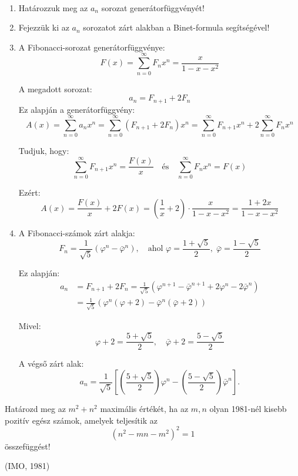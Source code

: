 \begin{solution}
~
\begin{enumerate}
\item Határozzuk meg az $a_{n}$ sorozat generátorfüggvényét! 
\item Fejezzük ki az $a_{n}$ sorozatot zárt alakban a Binet-formula segítségével! 
\item A Fibonacci-sorozat generátorfüggvénye: 
\[
F(x)=\sum_{n=0}^{\infty}F_{n}x^{n}=\frac{x}{1-x-x^{2}}
\]

A megadott sorozat: 
\[
a_{n}=F_{n+1}+2F_{n}
\]
Ez alapján a generátorfüggvény: 
\[
A(x)=\sum_{n=0}^{\infty}a_{n}x^{n}=\sum_{n=0}^{\infty}(F_{n+1}+2F_{n})x^{n}=\sum_{n=0}^{\infty}F_{n+1}x^{n}+2\sum_{n=0}^{\infty}F_{n}x^{n}
\]

Tudjuk, hogy: 
\[
\sum_{n=0}^{\infty}F_{n+1}x^{n}=\frac{F(x)}{x}\quad\text{és}\quad\sum_{n=0}^{\infty}F_{n}x^{n}=F(x)
\]

Ezért: 
\[
A(x)=\frac{F(x)}{x}+2F(x)=\left(\frac{1}{x}+2\right)\cdot\frac{x}{1-x-x^{2}}=\frac{1+2x}{1-x-x^{2}}
\]

\item A Fibonacci-számok zárt alakja: 
\[
F_{n}=\frac{1}{\sqrt{5}}\left(\varphi^{n}-\bar{\varphi}^{n}\right),\quad\text{ahol }\varphi=\frac{1+\sqrt{5}}{2},\;\bar{\varphi}=\frac{1-\sqrt{5}}{2}
\]

Ez alapján: 
\[
\begin{aligned}a_{n} & =F_{n+1}+2F_{n}=\frac{1}{\sqrt{5}}\left(\varphi^{n+1}-\bar{\varphi}^{n+1}+2\varphi^{n}-2\bar{\varphi}^{n}\right)\\
 & =\frac{1}{\sqrt{5}}\left(\varphi^{n}(\varphi+2)-\bar{\varphi}^{n}(\bar{\varphi}+2)\right)
\end{aligned}
\]

Mivel: 
\[
\varphi+2=\frac{5+\sqrt{5}}{2},\quad\bar{\varphi}+2=\frac{5-\sqrt{5}}{2}
\]

A végső zárt alak: 
\[
a_{n}=\frac{1}{\sqrt{5}}\left[\left(\frac{5+\sqrt{5}}{2}\right)\varphi^{n}-\left(\frac{5-\sqrt{5}}{2}\right)\bar{\varphi}^{n}\right].
\]

\end{enumerate}
\end{solution}
\begin{extraproblem}
Határozd meg az $m^{2}+n^{2}$ maximális értékét, ha az $m,n$ olyan
1981-nél kisebb pozitív egész számok, amelyek teljesítik az 
\begin{equation}
(n^{2}-mn-m^{2})^{2}=1\label{eq:fib_ta1}
\end{equation}
összefüggést! 
\begin{flushright}
(IMO, 1981) 
\par\end{flushright}
\end{extraproblem}

